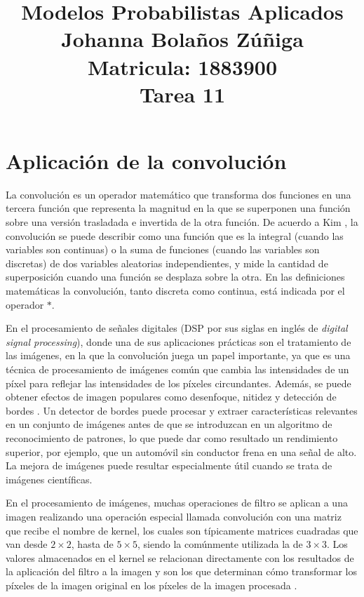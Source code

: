 \documentclass{article}
\title{
\centering
Modelos Probabilistas Aplicados \\
Johanna Bolaños Zúñiga \\
Matricula: 1883900\\
Tarea 11
}
\date{}
\begin{document}
\maketitle

\section{Aplicación de la convolución}

La convolución es un operador matemático que transforma dos funciones en una tercera función que representa la magnitud en la que se superponen una función sobre una versión trasladada e invertida de la otra función. De acuerdo a Kim \cite{kim}, la convolución se puede describir como una función que es la integral (cuando las variables son continuas) o la suma de funciones (cuando las variables son discretas) de dos variables aleatorias independientes, y mide la cantidad de superposición cuando una función se desplaza sobre la otra. En las definiciones matemáticas la convolución, tanto discreta como continua, está indicada por el operador \textbf{$*$}.

En el procesamiento de señales digitales (DSP por sus siglas en inglés de \textit{digital signal processing}), donde una de sus aplicaciones prácticas son el tratamiento de las imágenes, en la que la convolución juega un papel importante, ya que es una técnica de procesamiento de imágenes común que cambia las intensidades de un píxel para reflejar las intensidades de los píxeles circundantes. Además, se puede obtener efectos de imagen populares como desenfoque, nitidez y detección de bordes \cite{developer}. Un detector de bordes puede procesar y extraer características relevantes en un conjunto de imágenes antes de que se introduzcan en un algoritmo de reconocimiento de patrones, lo que puede dar como resultado un rendimiento superior, por ejemplo, que un automóvil sin conductor frena en una señal de alto. La mejora de imágenes puede resultar especialmente útil cuando se trata de imágenes científicas. 

En el procesamiento de imágenes, muchas operaciones de filtro se aplican a una imagen realizando una operación especial llamada convolución con una matriz que recibe el nombre de kernel, los cuales son típicamente matrices cuadradas que van desde $2\times2$, hasta de $5\times5$, siendo la comúnmente utilizada la de $3\times3$. Los valores almacenados en el kernel se relacionan directamente con los resultados de la aplicación del filtro a la imagen y son los que determinan cómo transformar los píxeles de la imagen original en los píxeles de la imagen procesada \cite{developer}.
\end{document}
